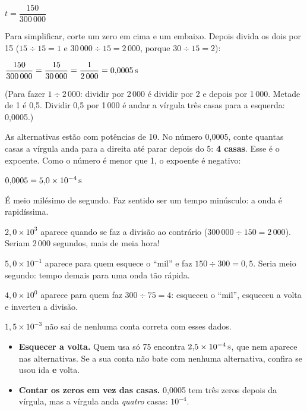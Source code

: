 \begin{conta}
$t = \dfrac{150}{300\,000}$
\end{conta}
Para simplificar, corte um zero em cima e um embaixo. Depois divida os dois por 15 ($15 \div 15 = 1$ e $30\,000 \div 15 = 2\,000$, porque $30 \div 15 = 2$):
\begin{conta}
$\dfrac{150}{300\,000} = \dfrac{15}{30\,000} = \dfrac{1}{2\,000} = 0{,}0005\,\text{s}$
\end{conta}
(Para fazer $1 \div 2\,000$: dividir por 2\,000 é dividir por 2 e depois por 1\,000. Metade de 1 é 0,5. Dividir 0,5 por 1\,000 é andar a vírgula três casas para a esquerda: 0,0005.)

As alternativas estão com potências de 10. No número 0,0005, conte quantas casas a vírgula anda para a direita até parar
depois do 5: \textbf{4 casas}. Esse é o expoente. Como o número é menor que 1, o expoente é negativo:
\begin{conta}
$0{,}0005 = 5{,}0 \times 10^{-4}\,\text{s}$
\end{conta}
É meio milésimo de segundo. Faz sentido ser um tempo minúsculo: a onda é rapidíssima.


\begin{outras}
 $2{,}0 \times 10^{3}$ aparece quando se faz a divisão ao contrário ($300\,000 \div 150 = 2\,000$). Seriam 2\,000 segundos, mais de meia hora!\par
{} $5{,}0 \times 10^{-1}$ aparece para quem esquece o ``mil'' e faz $150 \div 300 = 0{,}5$. Seria meio segundo: tempo demais para uma onda tão rápida.\par
{} $4{,}0 \times 10^{0}$ aparece para quem faz $300 \div 75 = 4$: esqueceu o ``mil'', esqueceu a volta e inverteu a divisão.\par
{} $1{,}5 \times 10^{-3}$ não sai de nenhuma conta correta com esses dados.
\end{outras}

\begin{pegadinha}
\begin{itemize}
  \item \textbf{Esquecer a volta.} Quem usa só 75 encontra $2{,}5 \times 10^{-4}\,\text{s}$, que nem aparece nas alternativas.
        Se a sua conta não bate com nenhuma alternativa, confira se usou ida \textbf{e} volta.
  \item \textbf{Contar os zeros em vez das casas.} 0,0005 tem três zeros depois da vírgula, mas a vírgula anda \emph{quatro} casas: $10^{-4}$.
\end{itemize}
\end{pegadinha}
